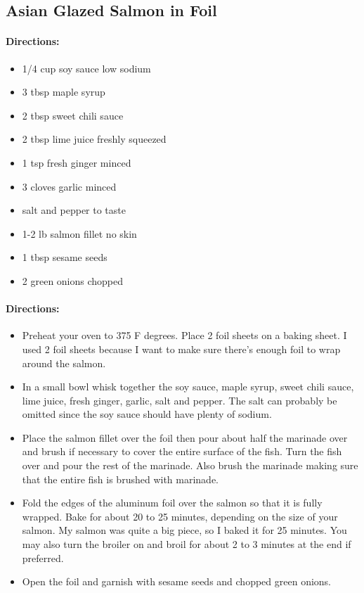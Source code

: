 \documentclass{article}
\begin{document}
\subsection{Asian Glazed Salmon in Foil}

\paragraph{Directions:}
\begin{itemize}
  \item 1/4 cup soy sauce low sodium
  \item 3 tbsp maple syrup
  \item 2 tbsp sweet chili sauce
  \item 2 tbsp lime juice freshly squeezed
  \item 1 tsp fresh ginger minced
  \item 3 cloves garlic minced
  \item salt and pepper to taste
  \item 1-2 lb salmon fillet no skin
  \item 1 tbsp sesame seeds
  \item 2 green onions chopped
\end{itemize}

\paragraph{Directions:}
\begin{itemize}
  \item Preheat your oven to 375 F degrees. Place 2 foil sheets on a baking sheet. I used 2 foil sheets because I
want to make sure there’s enough foil to wrap around the salmon.
  \item In a small bowl whisk together the soy sauce, maple syrup, sweet chili sauce, lime juice, fresh ginger,
garlic, salt and pepper. The salt can probably be omitted since the soy sauce should have plenty of
sodium.
  \item Place the salmon fillet over the foil then pour about half the marinade over and brush if necessary to
cover the entire surface of the fish. Turn the fish over and pour the rest of the marinade. Also brush the
marinade making sure that the entire fish is brushed with marinade.
  \item Fold the edges of the aluminum foil over the salmon so that it is fully wrapped. Bake for about 20 to
25 minutes, depending on the size of your salmon. My salmon was quite a big piece, so I baked it for 25
minutes. You may also turn the broiler on and broil for about 2 to 3 minutes at the end if preferred.
  \item Open the foil and garnish with sesame seeds and chopped green onions.
\end{itemize}
\end{document}
